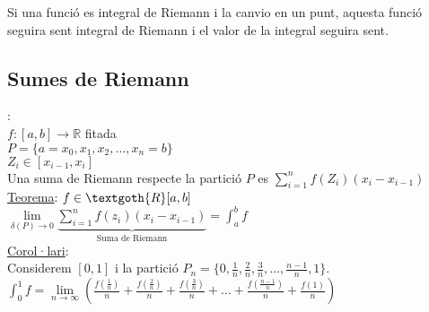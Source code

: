 Si una funció es integral de Riemann i la canvio en un punt, aquesta funció seguira sent integral de Riemann i el valor de la integral seguira sent.\\
\subsection{Sumes de Riemann}:\\
$f: [a, b] \rightarrow \mathbb{R}$ fitada\\
$P = \{a = x_0, x_1, x_2, \dots, x_n = b\}$\\
$Z_i \in [x_{i-1}, x_i]$\\
Una suma de Riemann respecte la partició $P$ es $\sum\limits_{i=1}^n f(Z_i)(x_i-x_{i-1})$\\
\underline{Teorema}: $f \in \textgoth{R}[a, b]$\\
$\lim\limits_{\delta(P) \rightarrow 0} \underbrace{\sum\limits_{i=1}^n f(z_i)(x_i-x_{i-1})}_\text{Suma de Riemann} = \int_a^b f$\\
\underline{Corol·lari}:\\
Considerem $[0, 1]$ i la partició $P_n = \{0, \frac{1}{n}, \frac{2}{n}, \frac{3}{n}, \dots, \frac{n-1}{n}, 1\}$.\\
$\int_0^1 f = \lim\limits_{n \rightarrow \infty} (\frac{f(\frac{1}{n})}{n}+\frac{f(\frac{2}{n})}{n}+\frac{f(\frac{3}{n})}{n}+\dots+\frac{f(\frac{n-1}{n})}{n}+\frac{f(1)}{n})$\\
